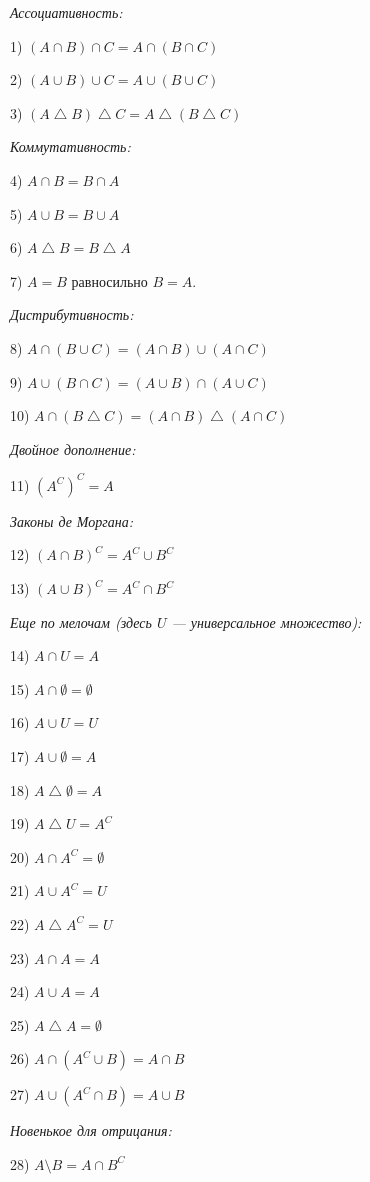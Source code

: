 {\slshape Ассоциативность:}

1) $(A \cap B) \cap C = A \cap (B \cap C)$

2) $(A \cup B) \cup C = A \cup (B \cup C)$

3) $(A \bigtriangleup B) \bigtriangleup C = A \bigtriangleup (B \bigtriangleup C)$

{\slshape Коммутативность:}

4) $A \cap B = B \cap A$

5) $A \cup B = B \cup A$

6) $A \bigtriangleup B = B \bigtriangleup A$

7) $A = B$ равносильно $B = A$.

{\slshape Дистрибутивность:}

8) $A \cap (B \cup C) = (A \cap B) \cup (A \cap C)$

9) $A \cup (B \cap C) = (A \cup B) \cap (A \cup C)$

10) $A \cap (B \bigtriangleup C) = (A \cap B) \bigtriangleup (A \cap C)$

{\slshape Двойное дополнение:}

11) $(A^C)^C = A$

{\slshape Законы де Моргана:}

12) $(A \cap B)^C = A^C \cup B^C$

13) $(A \cup B)^C =A^C \cap B^C$

{\slshape Еще по мелочам (здесь $U$ — универсальное множество):}

14) $A \cap U = A$

15) $A \cap \emptyset = \emptyset$

16) $A \cup U = U$

17) $A \cup \emptyset = A$

18) $A \bigtriangleup \emptyset = A$

19) $A \bigtriangleup U = A^C$

20) $A \cap A^C = \emptyset$

21) $A \cup A^C = U$

22) $A \bigtriangleup A^C = U$

23) $A\cap A = A$

24) $A\cup A = A$

25) $A \bigtriangleup A = \emptyset$

26) $A \cap (A^C \cup B) = A \cap B$

27) $A \cup (A^C \cap B) = A \cup B$

{\slshape Новенькое для отрицания:}

28) $A \setminus B = A \cap B^C$

